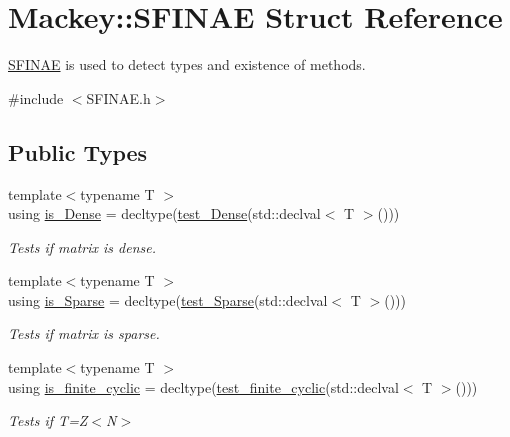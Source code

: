 \hypertarget{structMackey_1_1SFINAE}{}\section{Mackey\+:\+:S\+F\+I\+N\+AE Struct Reference}
\label{structMackey_1_1SFINAE}


\hyperlink{structMackey_1_1SFINAE}{S\+F\+I\+N\+AE} is used to detect types and existence of methods.  




{\ttfamily \#include $<$S\+F\+I\+N\+A\+E.\+h$>$}

\subsection*{Public Types}
\begin{DoxyCompactItemize}
\item 
{\footnotesize template$<$typename T $>$ }\\using \hyperlink{structMackey_1_1SFINAE_a1cea78d0d105adaafa9a77d13a77b790}{is\+\_\+\+Dense} = decltype(\hyperlink{structMackey_1_1SFINAE_a1b75937bad3b6d9d0eaff8bd81a03b16}{test\+\_\+\+Dense}(std\+::declval$<$ T $>$()))
\begin{DoxyCompactList}\small\item\em Tests if matrix is dense. \end{DoxyCompactList}\item 
{\footnotesize template$<$typename T $>$ }\\using \hyperlink{structMackey_1_1SFINAE_ab4f05241219d560e2e7cee5215cc37a5}{is\+\_\+\+Sparse} = decltype(\hyperlink{structMackey_1_1SFINAE_a822455b3ae1980be0801f1ca334b5765}{test\+\_\+\+Sparse}(std\+::declval$<$ T $>$()))
\begin{DoxyCompactList}\small\item\em Tests if matrix is sparse. \end{DoxyCompactList}\item 
{\footnotesize template$<$typename T $>$ }\\using \hyperlink{structMackey_1_1SFINAE_ac37cce8f1f1220e29653dbcc5f0b7090}{is\+\_\+finite\+\_\+cyclic} = decltype(\hyperlink{structMackey_1_1SFINAE_a2dd0f9b571ad5911cf90ae93a8e52d90}{test\+\_\+finite\+\_\+cyclic}(std\+::declval$<$ T $>$()))
\begin{DoxyCompactList}\small\item\em Tests if T=Z$<$\+N$>$ \end{DoxyCompactList}\item 

\end{DoxyCompactItemize}
